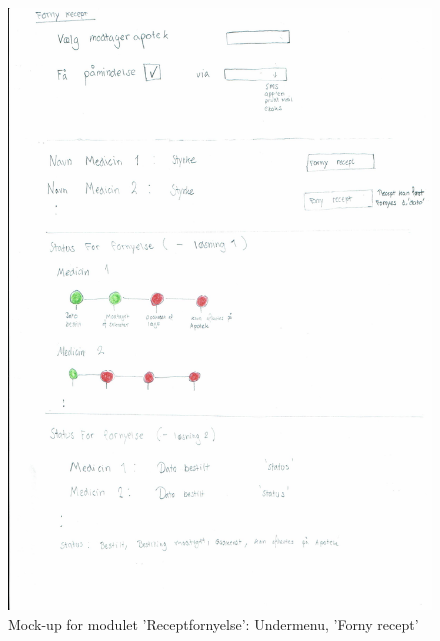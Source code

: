 \begin{figure}[H]
	\centering
	\includegraphics[angle=0, height=0.85\textheight]{Materials/FornyRecept.pdf}
	\caption{Mock-up for modulet 'Receptfornyelse': Undermenu, 'Forny recept'}
	\label{fig:Mock-Up}
\end{figure}
